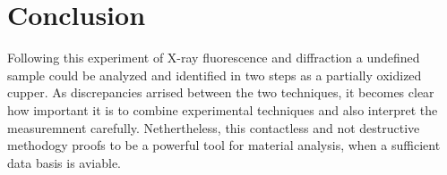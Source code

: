 
\section{Conclusion}
\label{sec:Conclusion}

Following this experiment of X-ray fluorescence and diffraction a undefined sample could be analyzed and identified in two steps as a partially oxidized cupper.
As discrepancies arrised between the two techniques, it becomes clear how important it is to combine experimental techniques and also interpret the measuremnent carefully.
Nethertheless, this contactless and not destructive methodogy proofs to be a powerful tool for material analysis, when a sufficient data basis is aviable.





